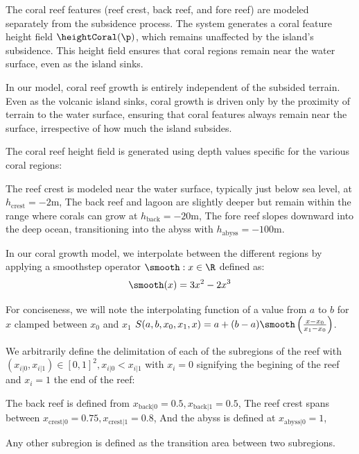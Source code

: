 The coral reef features (reef crest, back reef, and fore reef) are modeled separately from the subsidence process. The system generates a coral feature height field $\heightCoral(\p)$, which remains unaffected by the island's subsidence. This height field ensures that coral regions remain near the water surface, even as the island sinks.

In our model, coral reef growth is entirely independent of the subsided terrain. Even as the volcanic island sinks, coral growth is driven only by the proximity of terrain to the water surface, ensuring that coral features always remain near the surface, irrespective of how much the island subsides.

    The coral reef height field is generated using depth values specific for the various coral regions:
    \begin{Itemize}
        \Item{} The reef crest is modeled near the water surface, typically just below sea level, at $h_\text{crest} = -2$m,
        \Item{} The back reef and lagoon are slightly deeper but remain within the range where corals can grow at $h_\text{back} = -20$m,
        \Item{} The fore reef slopes downward into the deep ocean, transitioning into the abyss with $h_\text{abyss} = -100$m.
    \end{Itemize}

In our coral growth model, we interpolate between the different regions by applying a smoothstep operator $\smooth: x \in \R$ defined as:
\begin{align}
    \smooth(x) = 3x^2 - 2x^3
\end{align}

For conciseness, we will note the interpolating function of a value from $a$ to $b$ for $x$ clamped between $x_0$ and $x_1$ $S(a, b, x_0, x_1, x) = a + (b-a) \smooth\left(\frac{x - x_0}{x_1 - x_0}\right)$.

We arbitrarily define the delimitation of each of the subregions of the reef with $(x_{i|0}, x_{i|1}) \in [0, 1]^2, x_{i|0} < x_{i|1}$ with $x_i = 0$ signifying the begining of the reef and $x_i = 1$ the end of the reef:
\begin{Itemize}
    \Item{} The back reef is defined from $x_{\text{back}|0} = 0.5, x_{\text{back}|1} = 0.5$,
    \Item{} The reef crest spans between $x_{\text{crest}|0} = 0.75, x_{\text{crest}|1} = 0.8$,
    \Item{} And the abyss is defined at $x_{\text{abyss}|0} = 1$,
\end{Itemize}
Any other subregion is defined as the transition area between two subregions.

